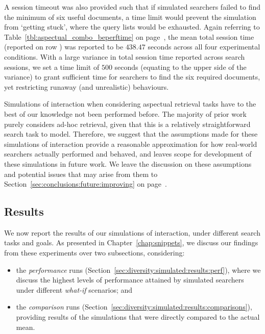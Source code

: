 A session timeout was also provided such that if simulated searchers failed to find the minimum of six useful documents, a time limit would prevent the simulation from `getting stuck', where the query lists would be exhausted. Again referring to Table~\ref{tbl:aspectual_combo_beperftime} on page~\pageref{tbl:aspectual_combo_beperftime}, the mean total session time (reported on row ) was reported to be $438.47$ seconds across all four experimental conditions. With a large variance in total session time reported across search sessions, we set a time limit of $500$ seconds (equating to the upper side of the variance) to grant sufficient time for searchers to find the six required documents, yet restricting runaway (and unrealistic) behaviours.

Simulations of interaction when considering aspectual retrieval tasks have to the best of our knowledge not been performed before. The majority of prior work purely considers ad-hoc retrieval, given that this is a relatively straightforward search task to model. Therefore, we suggest that the assumptions made for these simulations of interaction provide a reasonable approximation for how real-world searchers actually performed and behaved, and leaves scope for development of these simulations in future work. We leave the discussion on these assumptions and potential issues that may arise from them to Section~\ref{sec:conclusions:future:improving} on page~\pageref{sec:conclusions:future:improving}.

\subsection{Results}\label{sec:diversity:simulated:results}
We now report the results of our simulations of interaction, under different search tasks and goals. As presented in Chapter~\ref{chap:snippets}, we discuss our findings from these experiments over two subsections, considering:

\begin{itemize}
    \item{the \emph{performance} runs (Section~\ref{sec:diversity:simulated:results:perf}), where we discuss the highest levels of performance attained by simulated searchers under different \emph{what-if} scenarios; and}
    \item{the \emph{comparison} runs (Section~\ref{sec:diversity:simulated:results:comparisons}), providing results of the simulations that were directly compared to the actual mean.}
\end{itemize}

